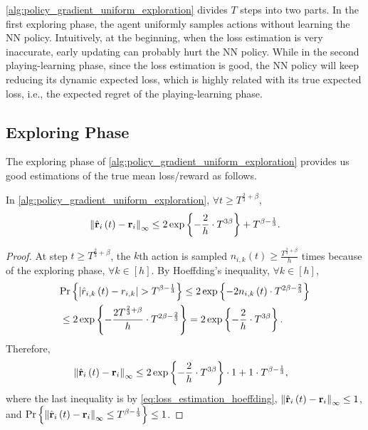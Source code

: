 \cref{alg:policy_gradient_uniform_exploration} divides $T$ steps into two parts. In the first exploring phase, the agent uniformly samples actions without learning the NN policy. Intuitively, at the beginning, when the loss estimation is very inaccurate, early updating can probably hurt the NN policy.  While in the second playing-learning phase, since the loss estimation is good, the NN policy will keep reducing its dynamic expected loss, which is highly related with its true expected loss, i.e., the expected regret of the playing-learning phase.

\subsection{Exploring Phase}
\label{subsec:exploring_phase}

The exploring phase of \cref{alg:policy_gradient_uniform_exploration} provides us good estimations of the true mean loss/reward as follows.
\begin{thm}
\label{thm:loss_estimation_hoeffding}
    In \cref{alg:policy_gradient_uniform_exploration}, $\forall t \ge T^{\frac{2}{3} + \beta}$,
\begin{equation*}
    \left\| \hat{{\mathbf{r}}}_i\left(t\right) - {\mathbf{r}}_i \right\|_\infty \le 2 \exp\left\{ - \frac{2}{h} \cdot  T^{3\beta} \right\} + T^{\beta - \frac{1}{3}}.
\end{equation*}
\end{thm}
\begin{proof}
    At step $t \ge T^{\frac{2}{3} + \beta}$, the $k$th action is sampled $n_{i, k}\left(t\right) \ge \frac{T^{\frac{2}{3} + \beta} }{h}$ times because of the exploring phase, $\forall k \in [h]$. By Hoeffding's inequality, $\forall k \in [h]$,
\begin{equation}
\label{eq:loss_estimation_hoeffding}
\begin{split}
    &{\text{Pr}}\left\{ \left| \hat{r}_{i, k}\left(t\right) - r_{i,k} \right| > T^{\beta - \frac{1}{3}} \right\} \le 2 \exp\left\{ - 2 n_{i, k}\left(t\right) \cdot T^{2\beta - \frac{2}{3}} \right\} \\
    &\le 2 \exp\left\{ -  \frac{2 T^{\frac{2}{3} + \beta}}{h} \cdot T^{2\beta - \frac{2}{3}} \right\} = 2 \exp\left\{ - \frac{2}{h} \cdot  T^{3\beta} \right\}.
\end{split}
\end{equation}
Therefore,
\begin{equation*}
\begin{split}
    &\left\| \hat{{\mathbf{r}}}_i\left(t\right) - {\mathbf{r}}_i \right\|_\infty \le 2 \exp\left\{ - \frac{2}{h} \cdot  T^{3\beta} \right\} \cdot 1 + 1 \cdot T^{\beta - \frac{1}{3}},
\end{split}
\end{equation*}
where the last inequality is by \cref{eq:loss_estimation_hoeffding}, $\left\| \hat{{\mathbf{r}}}_i\left(t\right) - {\mathbf{r}}_i \right\|_\infty \le 1$, and ${\text{Pr}}\left\{ \left\| \hat{{\mathbf{r}}}_i\left(t\right) - {\mathbf{r}}_i \right\|_\infty \le T^{\beta - \frac{1}{3}} \right\} \le 1$. 
\end{proof}


